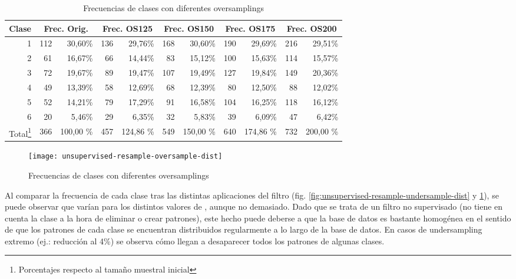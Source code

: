 \begin{table}[ht]
    \centering
    \begin{tabular}{|r|rr|rr|rr|rr|rr|}
        \hline
        \multicolumn{1}{|c|}{Clase} & \multicolumn{2}{c|}{Frec. Orig.} & \multicolumn{2}{c|}{Frec. OS125} & \multicolumn{2}{c|}{Frec. OS150} & \multicolumn{2}{c|}{Frec. OS175} & \multicolumn{2}{c|}{Frec. OS200} \\ 
        \hline
        1 & 112 & 30,60\% & 136 & 29,76\% & 168 & 30,60\% & 190 & 29,69\% & 216 & 29,51\% \\
        2 & 61  & 16,67\% & 66  & 14,44\% & 83  & 15,12\% & 100 & 15,63\% & 114 & 15,57\% \\
        3 & 72  & 19,67\% & 89  & 19,47\% & 107 & 19,49\% & 127 & 19,84\% & 149 & 20,36\% \\
        4 & 49  & 13,39\% & 58  & 12,69\% & 68  & 12,39\% & 80  & 12,50\% & 88  & 12,02\% \\
        5 & 52  & 14,21\% & 79  & 17,29\% & 91  & 16,58\% & 104 & 16,25\% & 118 & 16,12\% \\
        6 & 20  & 5,46\%  & 29  & 6,35\%  & 32  & 5,83\%  & 39  & 6,09\%  & 47  & 6,42\%  \\
        \hline
        Total\footnote{Porcentajes respecto al tamaño muestral inicial} & 366 & 100,00 \% & 457 & 124,86 \% & 549          & 150,00 \% & 640 & 174,86 \% & 732 & 200,00 \% \\
        \hline
    \end{tabular}
    \caption{Frecuencias de clases con diferentes oversamplings}
    \label{tab:unsupervised-resample-oversample-dist}
\end{table}
\begin{figure}[ht]
    \centering
    \texttt{[image: unsupervised-resample-oversample-dist]}
    \caption{Frecuencias de clases con diferentes oversamplings}
    \label{fig:unsupervised-resample-oversample-dist}
\end{figure}

Al comparar la frecuencia de cada clase tras las distintas aplicaciones del filtro (fig. \ref{fig:unsupervised-resample-undersample-dist} y \ref{fig:unsupervised-resample-oversample-dist}), se puede observar que varían para los distintos valores de , aunque no demasiado. Dado que se trata de un filtro no supervisado (no tiene en cuenta la clase a la hora de eliminar o crear patrones), este hecho puede deberse a que la base de datos es bastante homogénea en el sentido de que los patrones de cada clase se encuentran distribuidos regularmente a lo largo de la base de datos. En casos de undersampling extremo (ej.: reducción al 4\%) se observa cómo llegan a desaparecer todos los patrones de algunas clases.

